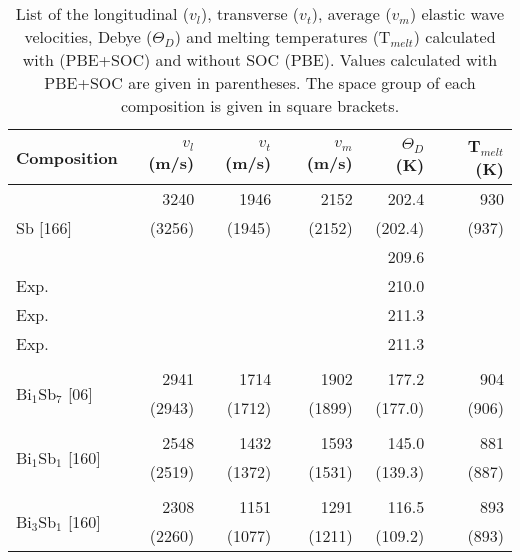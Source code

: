 \documentclass[twocolumn,superscriptaddress,nofootinbib,floatfix,aps,showpacs,prb,citeautoscript,reprint]{revtex4-1}
\begin{document}
\begin{table}[hbt!]
\centering
\caption{List of the longitudinal ($v_l$), transverse ($v_t$), average ($v_m$) elastic wave velocities, Debye ($\Theta_{D}$) and melting temperatures (T$_{melt}$) calculated with (PBE+SOC) and without SOC (PBE). Values calculated with PBE+SOC are given in parentheses. The space group of each composition is given in square brackets. \\ }
\begin{adjustbox}{width=0.48\textwidth} 
\begin{threeparttable}
    \setlength{\arrayrulewidth}{0.3mm}
\setlength{\tabcolsep}{6pt}
\renewcommand{\arraystretch}{1}
\begin{tabular}{lrrrrr}
  \hline
  {\bf Composition} & $v_{l}$ (m/s) & $v_{t}$ (m/s) & $v_{m}$ (m/s) & $\Theta_{D}$ (K) & T$_{melt}$ (K) \\
  \hline
\multirow{3}{*}{Sb [166]} & 3240 & 1946 & 2152 & 202.4 & 930  \\
				&      (3256) & (1945) & (2152) & (202.4) & (937) \\
\hspace{1cm} Exp.\tnote{$a$}	&  &  & &  209.6 \\ 
\hspace{1cm} Exp.\tnote{$b$}	&  & & &  210.0 \\ 
\hspace{1cm} Exp.\tnote{$c$}	&  & & &  211.3 \\ 
\hspace{1cm} Exp.\tnote{$d$}	&  & & &  211.3 \\ 

\hline\\
\multirow{2}{*}{Bi$_{1}$Sb$_{7}$ [06]}  & 2941 & 1714 & 1902 & 177.2 & 904 \\
							&    (2943) & (1712) & (1899) & (177.0) & (906) \\
\hline\\
\multirow{2}{*}{Bi$_{1}$Sb$_{1}$ [160]}  & 2548 & 1432 & 1593 & 145.0 & 881 \\
							&    (2519) & (1372) & (1531) & (139.3) & (887) \\
							
\hline\\
\multirow{2}{*}{Bi$_{3}$Sb$_{1}$ [160]}  & 2308 & 1151 & 1291 & 116.5 & 893 \\
							&    (2260) & (1077) & (1211) & (109.2) & (893) \\ 
 

\end{tabular}
\end{threeparttable}
\end{adjustbox}
\end{table}
\end{document}
